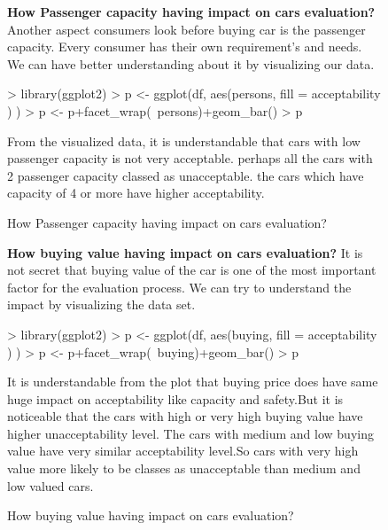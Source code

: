 \documentclass{article}
\begin{document}
\begin{figure}
\textbf{How Passenger capacity having impact on cars evaluation?}\break
Another aspect consumers look before buying car is the passenger capacity. Every consumer has their own requirement's and needs. We can have better understanding about it by visualizing our data. 
\begin{Schunk}
\begin{Sinput}
> library(ggplot2)
> p <- ggplot(df, aes(persons, fill = acceptability ) ) 
> p <- p+facet_wrap(~persons)+geom_bar()
> p
\end{Sinput}
\end{Schunk}
\caption{How Passenger capacity having impact on cars evaluation?}
From the visualized data, it is understandable that cars with low passenger capacity is not very acceptable. perhaps all the cars with 2 passenger capacity classed as unacceptable. the cars which have capacity of 4 or more have higher acceptability.
\end{figure}

\begin{figure}
\textbf{How buying value having impact on cars evaluation?}
It is not secret that buying value of the car is one of the most important factor for the evaluation process. We can try to understand the impact by visualizing the data set. 
\begin{Schunk}
\begin{Sinput}
> library(ggplot2)
> p <- ggplot(df, aes(buying, fill = acceptability ) ) 
> p <- p+facet_wrap(~buying)+geom_bar()
> p
\end{Sinput}
\end{Schunk}
\caption{How buying value having impact on cars evaluation?}\break
It is understandable from the plot that buying price does have same huge impact on acceptability like capacity and safety.But it is noticeable that  the cars with high or very high buying value have higher unacceptability level. The cars with medium and low buying value have very similar acceptability level.So cars with very high value more likely to be classes as unacceptable than medium and low valued cars.
\end{figure}

\newpage
\end{document}
